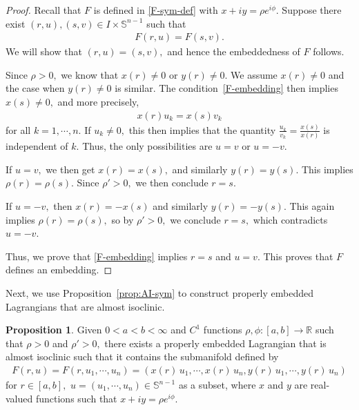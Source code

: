 \documentclass[11pt]{amsart}
\numberwithin{equation}{section}
\theoremstyle{definition}
\theoremstyle{definition}
\newtheorem{prop}[equation]{Proposition} %
\newcommand{\pr}[1]{\left(#1\right)}
\newcommand{\bb}[1]{\mathbb{#1}} \newcommand{\td}[1]{\widetilde{#1}}
\begin{document}
\begin{proof}
	Recall that $F$ is defined in \eqref{F-sym-def} with $x+iy=\rho e^{i\phi}.$
	Suppose there exist $(r,u),(s,v)\in I\times \mathbb S^{n-1}$ such that
	\begin{align}\label{F-embedding}
	F(r,u)
	= F(s,v).
	\end{align}
	We will show that $(r,u)=(s,v),$ and hence the embeddedness of $F$ follows.
	
	Since $\rho>0,$ we know that $x(r)\neq 0$ or $y(r)\neq 0.$
	We assume $x(r)\neq 0$ and the case when $y(r)\neq 0$ is similar.
	The condition~\eqref{F-embedding} then implies $x(s)\neq 0,$ and more precisely,
	\begin{align*}
	x(r) u_k = x(s) v_k
	\end{align*}
	for all $k=1,\cdots,n.$
	If $u_k\neq 0,$ this then implies that the quantity
	$\frac{u_k}{v_k}=\frac{x(s)}{x(r)}$
	is independent of $k.$
	Thus, the only possibilities are $u=v$ or $u=-v.$
	
	If $u=v,$ we then get $x(r)=x(s),$ and similarly $y(r)=y(s).$
	This implies $\rho(r)=\rho(s).$
	Since $\rho'>0,$ we then conclude $r=s.$
	
	If $u=-v,$ then $x(r)=-x(s)$ and similarly $y(r)=-y(s).$
	This again implies $\rho(r)=\rho(s),$ so by $\rho'>0,$ we conclude $r=s,$ which contradicts $u=-v.$
	
	Thus, we prove that \eqref{F-embedding} implies $r=s$ and $u=v.$
	This proves that $F$ defines an embedding.
\end{proof}


Next, we use Proposition~\ref{prop:AI-sym} to construct properly embedded Lagrangians that are almost isoclinic.


\begin{prop}
	\label{prop:SOn-general-example}
	Given $0<a<b<\infty$ and $C^1$ functions $\rho,\phi\colon[a,b]\to\bb R$ such that $\rho>0$ and $\rho'>0,$ there exists a properly embedded Lagrangian that is almost isoclinic such that it contains the submanifold defined by
	\begin{align*}
	F(r,u)
	= F(r,u_1,\cdots,u_n)
	= \pr{x(r)\,u_1,
		\cdots ,
		x(r)\,u_n,
		y(r)\,u_1,
		\cdots,
		y(r)\,u_n}
	\end{align*}
	for $r\in [a,b],$ $u=(u_1,\cdots,u_n)\in \mathbb S^{n-1}$ as a subset, where $x$ and $y$ are real-valued functions such that
	$x+iy = \rho e^{i\phi}.$
\end{prop}
\end{document}
